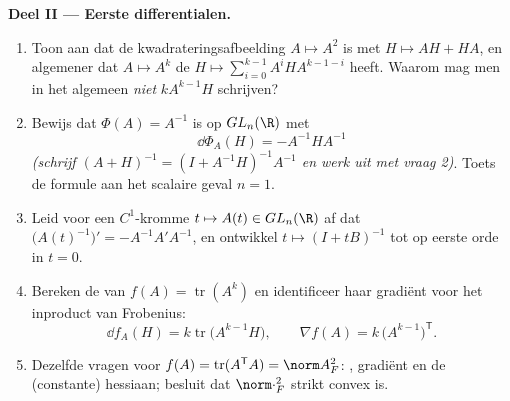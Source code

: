 \begin{problem}
\medskip
\noindent\textbf{Deel II --- Eerste differentialen.}
\begin{enumerate}[resume]
  \item Toon aan dat de kwadrateringsafbeelding $A \mapsto A^2$
         is met  $H \mapsto AH +
        HA$, en algemener dat $A \mapsto A^k$ de  $H
        \mapsto \sum_{i=0}^{k-1} A^iHA^{k-1-i}$ heeft. Waarom mag
        men in het algemeen \emph{niet} $kA^{k-1}H$ schrijven?
  \item Bewijs dat $\Phi(A) = A^{-1}$  is op
        $GL_n(\R)$ met
        \[
        \dd\Phi_A(H) = -A^{-1}HA^{-1}
        \]
        \emph{(schrijf $(A + H)^{-1} = (I + A^{-1}H)^{-1}A^{-1}$
        en werk uit met vraag 2)}. Toets de formule aan het
        scalaire geval $n = 1$.
  \item Leid voor een $C^1$-kromme $t \mapsto A(t) \in GL_n(\R)$
        af dat $\bigl(A(t)^{-1}\bigr)' = -A^{-1}A'A^{-1}$, en
        ontwikkel $t \mapsto (I + tB)^{-1}$ tot op eerste orde in
        $t = 0$.
  \item Bereken de  van $f(A) =
        \operatorname{tr}(A^k)$ en identificeer haar gradiënt voor
        het inproduct van Frobenius:
        \[
        \dd f_A(H) = k\operatorname{tr}\bigl(A^{k-1}H\bigr),
        \qquad
        \nabla f(A) = k\,\bigl(A^{k-1}\bigr)^{\mathsf T} .
        \]
  \item Dezelfde vragen voor $f(A) = \operatorname{tr}(A^{\mathsf
        T}A) = \norm A_F^2$: , gradiënt en de
        (constante) hessiaan; besluit dat $\norm\cdot_F^2$ strikt
        convex is.
\end{enumerate}


\end{problem}
